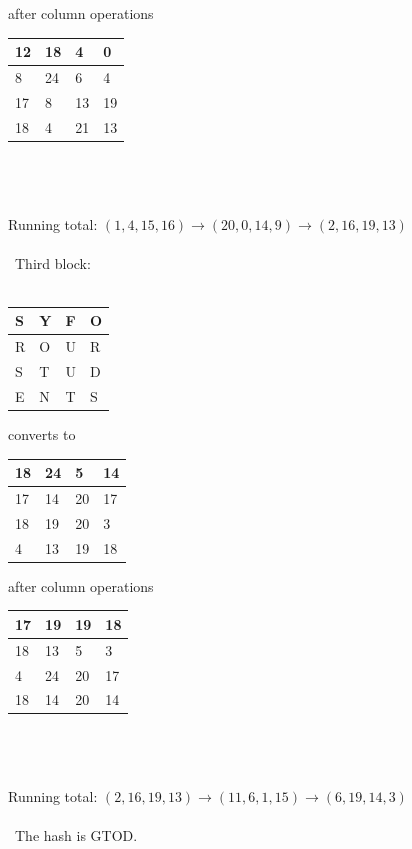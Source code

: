 \documentclass[a4paper]{article}
\begin{document}
\quad
after column operations
\quad
\begin{tabular}{|l|l|l|l|}
\hline
12 & 18 & 4 &0 \\ \hline
8 & 24 & 6 & 4 \\ \hline
17 & 8 & 13 &19 \\ \hline
18 & 4 & 21 & 13 \\ \hline
\end{tabular}
\\\\\\Running total: $(1, 4, 15, 16) \rightarrow (20, 0, 14, 9) \rightarrow (2, 16, 19, 13)$\\\\\
Third block:\\\\
\begin{tabular}{|l|l|l|l|}
\hline
S & Y & F & O \\ \hline
R & O & U & R \\ \hline
S & T & U & D \\ \hline
E & N & T & S \\ \hline
\end{tabular}
\quad
converts to 
\quad
\begin{tabular}{|l|l|l|l|}
\hline
18 & 24 & 5 & 14 \\ \hline
17 & 14 & 20 & 17 \\ \hline
18 & 19 & 20 &3 \\ \hline
4 & 13 & 19 & 18 \\ \hline
\end{tabular}
\quad
after column operations
\quad
\begin{tabular}{|l|l|l|l|}
\hline
17 & 19 & 19 &18 \\ \hline
18 & 13 & 5 & 3 \\ \hline
4 & 24 & 20 &17 \\ \hline
18 & 14 & 20 & 14 \\ \hline
\end{tabular}
\\\\\\Running total: $(2, 16, 19, 13) \rightarrow (11, 6, 1, 15) \rightarrow (6, 19, 14, 3)$\\\\\
The hash is GTOD.
\end{document}
